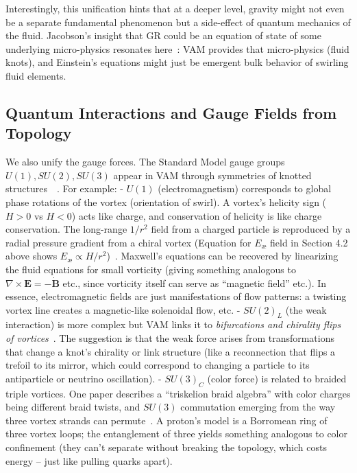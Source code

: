 \documentclass[preprint]{revtex4-2}
\begin{document}
    Interestingly, this unification hints that at a deeper level, gravity might not even be a separate fundamental phenomenon but a side-effect of quantum mechanics of the fluid. Jacobson’s insight that GR could be an equation of state of some underlying micro-physics resonates here~\cite{reference_153}: VAM provides that micro-physics (fluid knots), and Einstein’s equations might just be emergent bulk behavior of swirling fluid elements.

    \subsection{Quantum Interactions and Gauge Fields from Topology}
    We also unify the gauge forces. The Standard Model gauge groups $U(1), SU(2), SU(3)$ appear in VAM through symmetries of knotted structures~\cite{reference_154}~\cite{reference_155}. For example:
    - $U(1)$ (electromagnetism) corresponds to global phase rotations of the vortex (orientation of swirl). A vortex’s helicity sign ($H>0$ vs $H<0$) acts like charge, and conservation of helicity is like charge conservation. The long-range $1/r^2$ field from a charged particle is reproduced by a radial pressure gradient from a chiral vortex (Equation for $E_{\text{\ae}}$ field in Section 4.2 above shows $E_{\text{\ae}} \propto H/r^2$)~\cite{reference_156}. Maxwell’s equations can be recovered by linearizing the fluid equations for small vorticity (giving something analogous to $\nabla \times \mathbf{E} = -\dot{\mathbf{B}}$ etc., since vorticity itself can serve as “magnetic field” etc.). In essence, electromagnetic fields are just manifestations of flow patterns: a twisting vortex line creates a magnetic-like solenoidal flow, etc.
    - $SU(2)_L$ (the weak interaction) is more complex but VAM links it to \emph{bifurcations and chirality flips of vortices}~\cite{reference_157}. The suggestion is that the weak force arises from transformations that change a knot’s chirality or link structure (like a reconnection that flips a trefoil to its mirror, which could correspond to changing a particle to its antiparticle or neutrino oscillation).
    - $SU(3)_C$ (color force) is related to braided triple vortices. One paper describes a “triskelion braid algebra” with color charges being different braid twists, and $SU(3)$ commutation emerging from the way three vortex strands can permute~\cite{reference_158}. A proton’s model is a Borromean ring of three vortex loops; the entanglement of three yields something analogous to color confinement (they can’t separate without breaking the topology, which costs energy – just like pulling quarks apart).
\end{document}
